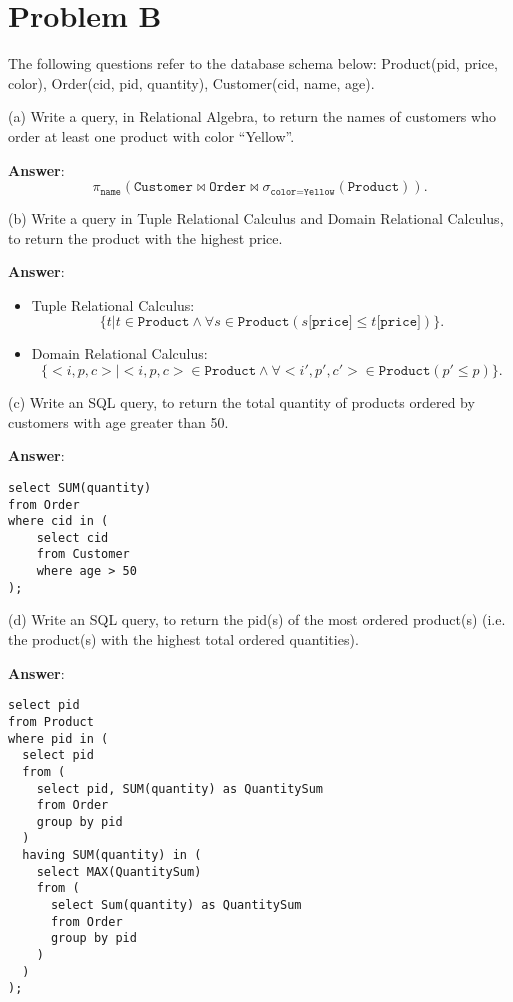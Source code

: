 \documentclass{article}
\begin{document}
\section{Problem B}
The following questions refer to the database schema below: Product(pid, price, color), Order(cid, pid, quantity), Customer(cid, name, age).

(a) Write a query, in Relational Algebra, to return the names of customers who order at least one product with color ``Yellow''.

{\bf Answer}: $$\pi_{\texttt{name}} (\texttt{Customer} \bowtie \texttt{Order} \bowtie \sigma_{\texttt{color} = \texttt{Yellow}}(\texttt{Product})).$$

(b) Write a query in Tuple Relational Calculus and Domain Relational Calculus, to return the product with the highest price.

{\bf Answer}: 
\begin{itemize}
\item Tuple Relational Calculus:
$$\{t | t \in \texttt{Product} \wedge \forall s \in \texttt{Product} (s\texttt{[price]} \leq t\texttt{[price]})\}.$$
\item Domain Relational Calculus:
$$\{<i, p, c> | <i, p, c> \in \texttt{Product} \wedge \forall <i', p', c'> \in \texttt{Product} (p' \leq p)\}.$$
\end{itemize}

(c) Write an SQL query, to return the total quantity of products ordered by customers with age greater than 50.

{\bf Answer}:
\begin{verbatim}
select SUM(quantity)
from Order
where cid in (
    select cid
    from Customer
    where age > 50
);
\end{verbatim}

(d) Write an SQL query, to return the pid(s) of the most ordered product(s) (i.e. the product(s) with the highest total ordered quantities).

{\bf Answer}: 
\begin{verbatim}
select pid
from Product
where pid in (
  select pid
  from (
    select pid, SUM(quantity) as QuantitySum
    from Order
    group by pid
  )
  having SUM(quantity) in (
    select MAX(QuantitySum)
    from (
      select Sum(quantity) as QuantitySum
      from Order
      group by pid
    )
  )
);
\end{verbatim}
\end{document}
